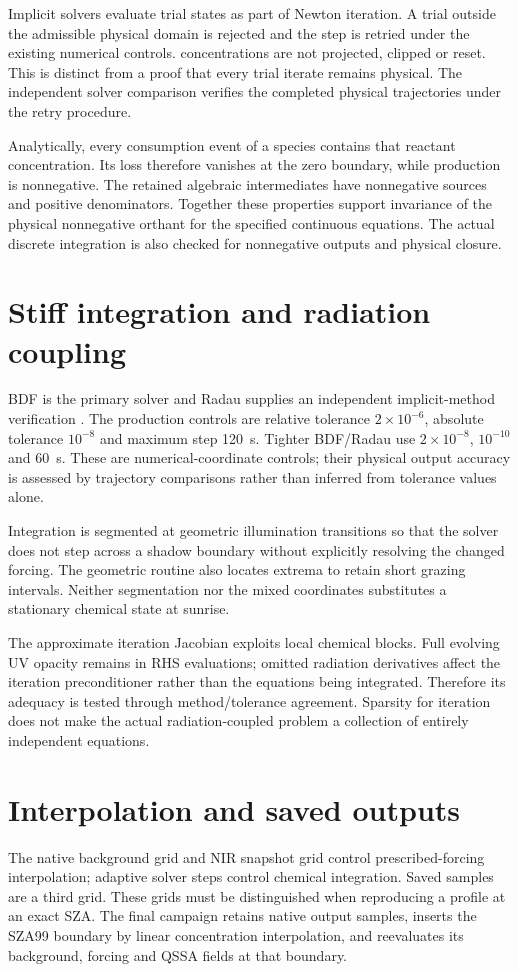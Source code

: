Implicit solvers evaluate trial states as part of Newton iteration. A trial outside the admissible physical domain is rejected and the step is retried under the existing numerical controls. concentrations are not projected, clipped or reset. This is distinct from a proof that every trial iterate remains physical. The independent solver comparison verifies the completed physical trajectories under the retry procedure.

Analytically, every consumption event of a species contains that reactant concentration. Its loss therefore vanishes at the zero boundary, while production is nonnegative. The retained algebraic intermediates have nonnegative sources and positive denominators. Together these properties support invariance of the physical nonnegative orthant for the specified continuous equations. The actual discrete integration is also checked for nonnegative outputs and physical closure.

\section{Stiff integration and radiation coupling}
BDF is the primary solver and Radau supplies an independent implicit-method verification \citep{scipyivp}. The production controls are relative tolerance $2\times10^{-6}$, absolute tolerance $10^{-8}$ and maximum step 120~s. Tighter BDF/Radau use $2\times10^{-8}$, $10^{-10}$ and 60~s. These are numerical-coordinate controls; their physical output accuracy is assessed by trajectory comparisons rather than inferred from tolerance values alone.

Integration is segmented at geometric illumination transitions so that the solver does not step across a shadow boundary without explicitly resolving the changed forcing. The geometric routine also locates extrema to retain short grazing intervals. Neither segmentation nor the mixed coordinates substitutes a stationary chemical state at sunrise.

The approximate iteration Jacobian exploits local chemical blocks. Full evolving UV opacity remains in RHS evaluations; omitted radiation derivatives affect the iteration preconditioner rather than the equations being integrated. Therefore its adequacy is tested through method/tolerance agreement. Sparsity for iteration does not make the actual radiation-coupled problem a collection of entirely independent equations.

\section{Interpolation and saved outputs}
The native background grid and NIR snapshot grid control prescribed-forcing interpolation; adaptive solver steps control chemical integration. Saved samples are a third grid. These grids must be distinguished when reproducing a profile at an exact SZA. The final campaign retains native output samples, inserts the SZA99 boundary by linear concentration interpolation, and reevaluates its background, forcing and QSSA fields at that boundary.


